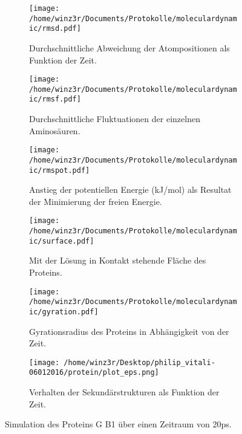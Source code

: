 \begin{figure}
\begin{subfigure}{0.45\textwidth}
\texttt{[image: /home/winz3r/Documents/Protokolle/moleculardynamic/rmsd.pdf]}\caption{\centering Durchschnittliche Abweichung der Atompositionen als Funktion der Zeit.}\label{fig:rmsd}
\end{subfigure}
\hspace{0.1cm}
\begin{subfigure}{0.45\textwidth}
\texttt{[image: /home/winz3r/Documents/Protokolle/moleculardynamic/rmsf.pdf]}\caption{\centering Durchschnittliche Fluktuationen der einzelnen Aminosäuren.}\label{fig:rmsf}
\end{subfigure}
\vspace{0.5cm}
\begin{subfigure}{0.45\textwidth}
\texttt{[image: /home/winz3r/Documents/Protokolle/moleculardynamic/rmspot.pdf]}\caption{\centering Anstieg der potentiellen Energie (kJ/mol) als Resultat der Minimierung der freien Energie.}\label{fig:rmspot}
\end{subfigure}
\hspace{1cm}
\begin{subfigure}{0.45\textwidth}
\texttt{[image: /home/winz3r/Documents/Protokolle/moleculardynamic/surface.pdf]}\caption{\centering Mit der Lösung in Kontakt stehende Fläche des Proteins.}\label{fig:rmsurf}
\end{subfigure}
\vspace{0.5cm}
\begin{subfigure}{0.45\textwidth}
\texttt{[image: /home/winz3r/Documents/Protokolle/moleculardynamic/gyration.pdf]}\caption{\centering Gyrationsradius des Proteins in Abhängigkeit von der Zeit.}\label{fig:rmgyr}
\end{subfigure}
\hspace{1cm}
\begin{subfigure}{0.45\textwidth}
\texttt{[image: /home/winz3r/Desktop/philip\_vitali-06012016/protein/plot\_eps.png]}\caption{\centering Verhalten der Sekundärstrukturen als Funktion der Zeit.}\label{fig:sekund}
\end{subfigure}
\caption{Simulation des Proteins G B1 über einen Zeitraum von 20ps.}
\end{figure}

